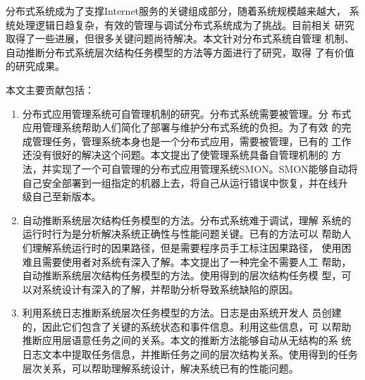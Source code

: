 \begin{cabstract}


  分布式系统成为了支撑Internet服务的关键组成部分，随着系统规模越来越大，
  系统处理逻辑日趋复杂，有效的管理与调试分布式系统成为了挑战。目前相关
  研究取得了一些进展，但很多关键问题尚待解决。本文针对分布式系统自管理
  机制、自动推断分布式系统层次结构任务模型的方法等方面进行了研究，取得
  了有价值的研究成果。

  本文主要贡献包括：

  \begin{enumerate}

    \item 分布式应用管理系统可自管理机制的研究。分布式系统需要被管理。分
    布式应用管理系统帮助人们简化了部署与维护分布式系统的负担。为了有效
    的完成管理任务，管理系统本身也是一个分布式应用，需要被管理，已有的
    工作还没有很好的解决这个问题。本文提出了使管理系统具备自管理机制的
    方法，并实现了一个可自管理的分布式应用管理系统SMON。SMON能够自动将
    自己安全部署到一组指定的机器上去，将自己从运行错误中恢复，并在线升
    级自己至新版本。

    \item 自动推断系统层次结构任务模型的方法。分布式系统难于调试，理解
    系统的运行时行为是分析解决系统正确性与性能问题关键。已有的方法可以
    帮助人们理解系统运行时的因果路径，但是需要程序员手工标注因果路径，
    使用困难且需要使用者对系统有深入了解。本文提出了一种完全不需要人工
    帮助，自动推断系统层次结构任务模型的方法。使用得到的层次结构任务模
    型，可以对系统设计有深入的了解，并帮助分析导致系统缺陷的原因。

    \item 利用系统日志推断系统层次任务模型的方法。日志是由系统开发人
    员创建的，因此它们包含了关键的系统状态和事件信息。利用这些信息，可
    以帮助推断应用层语意任务之间的关系。本文的推断方法能够自动从无结构的系
    统日志文本中提取任务信息，并推断任务之间的层次结构关系。使用得到的任务
    层次关系，可以帮助理解系统设计，解决系统已有的性能问题。

  \end{enumerate}

\end{cabstract}


